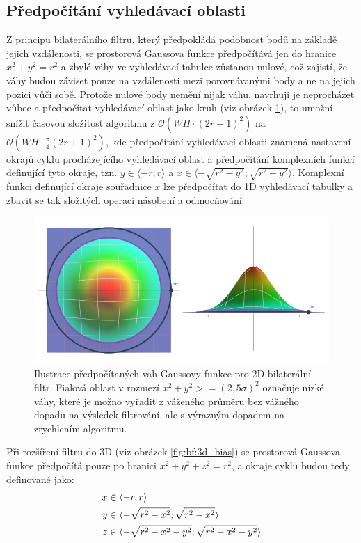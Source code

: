 \subsection*{Předpočítání vyhledávací oblasti}
\label{subsec:bf:precomupte_bias}
Z principu bilaterálního filtru, který předpokládá podobnost bodů na základě jejich vzdálenosti, se prostorová Gaussova funkce předpočítává jen do hranice $x^2+y^2=r^2$ a zbylé váhy ve vyhledávací tabulce zůstanou nulové, což zajistí, že váhy budou záviset pouze na vzdálenosti mezi porovnávanými body a ne na jejich pozici vůči sobě. Protože nulové body nemění nijak váhu, navrhuji je neprocházet vůbec a předpočítat vyhledávací oblast jako kruh (viz obrázek \ref{fig:bf:3d_gauss_bias}), to umožní snížit časovou složitost algoritmu z $\mathcal{O}(WH\cdot(2r+1)^2)$ na $\mathcal{O}(WH\cdot\frac{\pi}{4}(2r+1)^2)$, kde předpočítání vyhledávací oblasti znamená nastavení okrajů cyklu procházejícího vyhledávací oblast a předpočítání komplexních funkcí definující tyto okraje, tzn. $y \in \langle-r;r\rangle$ a $x \in \langle-\sqrt{r^2 - y^2};\sqrt{r^2 - y^2}\rangle$. Komplexní funkci definující okraje souřadnice $x$ lze předpočítat do 1D vyhledávací tabulky a zbavit se tak složitých operací násobení a odmocňování.

\begin{figure} [H]
    \centering
    \label{fig:bf:3d_gauss_bias}
    \includegraphics[width=1\textwidth]{figures/bf-3d-gauss-2.png}
    \caption{Ilustrace předpočítaných vah Gaussovy funkce pro 2D bilaterální filtr. Fialová oblast v rozmezí $x^2+y^2>=(2,5\sigma)^2$ označuje nízké váhy, které je možno vyřadit z váženého průměru bez vážného dopadu na výsledek filtrování, ale s výrazným dopadem na zrychlením algoritmu.}
\end{figure}

Při rozšíření filtru do 3D  (viz obrázek \ref{fig:bf:3d_bias}) se prostorová Gaussova funkce předpočítá pouze po hranici $x^2+y^2+z^2=r^2$, a okraje cyklu budou tedy definované jako:
\begin{align*}
    \centering
    x & \in \langle-r,r\rangle \\
    y & \in \langle-\sqrt{r^2-x^2};\sqrt{r^2-x^2}\rangle \\
    z & \in \langle-\sqrt{r^2-x^2-y^2};\sqrt{r^2-x^2-y^2}\rangle
\end{align*}

